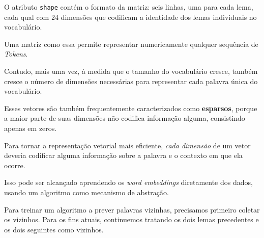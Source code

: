 \documentclass[
  brazilian,
]{article}
\begin{document}
O atributo \texttt{shape} contém o formato da matriz: seis linhas, uma
para cada lema, cada qual com 24 dimensões que codificam a identidade
dos lemas individuais no vocabulário.

Uma matriz como essa permite representar numericamente qualquer
sequência de \emph{Tokens}.

Contudo, mais uma vez, à medida que o tamanho do vocabulário cresce,
também cresce o número de dimensões necessárias para representar cada
palavra única do vocabulário.

Esses vetores são também frequentemente caracterizados como
\textbf{esparsos}, porque a maior parte de suas dimensões não codifica
informação alguma, consistindo apenas em zeros.

Para tornar a representação vetorial mais eficiente, \emph{cada
dimensão} de um vetor deveria codificar alguma informação sobre a
palavra e o contexto em que ela ocorre.

Isso pode ser alcançado aprendendo os \emph{word embeddings} diretamente
dos dados, usando um algoritmo como mecanismo de abstração.

Para treinar um algoritmo a prever palavras vizinhas, precisamos
primeiro coletar os vizinhos. Para os fins atuais, continuemos tratando
os dois lemas precedentes e os dois seguintes como vizinhos.
\end{document}
